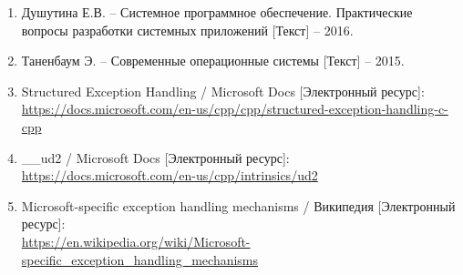 \begin{enumerate}
	\item Душутина Е.В. -- Системное программное обеспечение. Практические вопросы разработки системных приложений [Текст] -- 2016.
	\item Таненбаум Э. -- Современные операционные системы [Текст] -- 2015.
	\item Structured Exception Handling / Microsoft Docs [Электронный ресурс]:\\
		{\small\url{https://docs.microsoft.com/en-us/cpp/cpp/structured-exception-handling-c-cpp}}
	\item \_\_ud2 / Microsoft Docs [Электронный ресурс]:\\
		{\small\url{https://docs.microsoft.com/en-us/cpp/intrinsics/ud2}}
	\item Microsoft-specific exception handling mechanisms / Википедия [Электронный ресурс]:\\
		{\small\url{https://en.wikipedia.org/wiki/Microsoft-specific_exception_handling_mechanisms}}
\end{enumerate}


